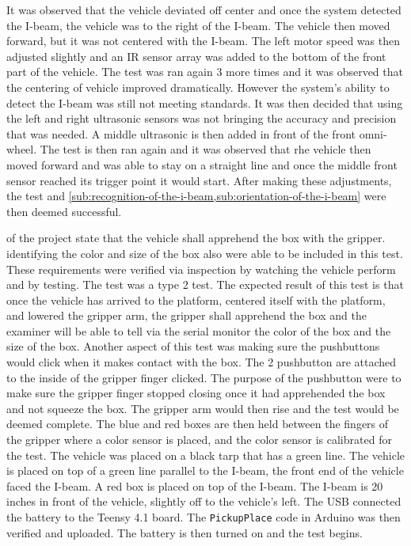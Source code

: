\documentclass[11pt]{report}
\begin{document}
It was observed that the vehicle deviated off center and once the system detected the I-beam, the vehicle was to the right of the I-beam. The vehicle then moved forward, but it was not centered with the I-beam. The left motor speed was then adjusted slightly and an \gls{IR} sensor array was added to the bottom of the front part of the vehicle. The test was ran again 3 more times and it was observed that the centering of vehicle improved dramatically. However the system’s ability to detect the I-beam was still not meeting standards. It was then decided that using the left and right ultrasonic sensors was not bringing the accuracy and precision that was needed. A middle ultrasonic is then added in front of the front omni-wheel. The test is then ran again and it was observed that rhe vehicle then moved forward and was able to stay on a straight line and once the middle front sensor reached its trigger point it would start. After making these adjustments, the test and \cref{sub:recognition-of-the-i-beam,sub:orientation-of-the-i-beam} were then deemed successful.

\label{tst:pickup-of-box}
 of the project state that the vehicle shall apprehend the box with the gripper.  identifying the color and size of the box also were able to be included in this test. These requirements were verified via inspection by watching the vehicle perform and by testing. The test was a type 2 test. The expected result of this test is that once the vehicle has arrived to the platform, centered itself with the platform, and lowered the gripper arm, the gripper shall apprehend the box and the examiner will be able to tell via the serial monitor the color of the box and the size of the box. Another aspect of this test was making sure the pushbuttons would click when it makes contact with the box. The 2 pushbutton are attached to the inside of the gripper finger clicked. The purpose of the pushbutton were to make sure the gripper finger stopped closing once it had apprehended the box and not squeeze the box. The gripper arm would then rise and the test would be deemed complete.  The blue and red boxes are then held between the fingers of the gripper where a color sensor is placed, and the color sensor is calibrated for the test. The vehicle was placed on a black tarp that has a green line. The vehicle is placed on top of a green line parallel to the I-beam, the front end of the vehicle faced the I-beam. A red box is placed on top of the I-beam. The I-beam is 20 inches in front of the vehicle, slightly off to the vehicle’s left. The USB connected the battery to the Teensy 4.1 board. The \texttt{PickupPlace} code in Arduino was then verified and uploaded. The battery is then turned on and the test begins. 
\end{document}
